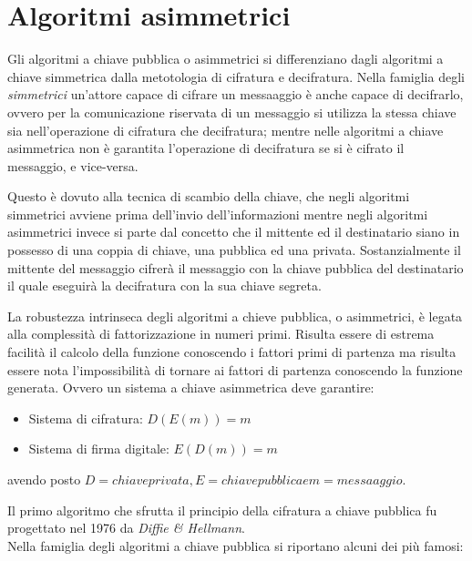 \documentclass[11pt, a4paper, oneside]{Thesis} %
\begin{document}
\section{Algoritmi asimmetrici}
Gli algoritmi a chiave pubblica o asimmetrici si differenziano dagli algoritmi a chiave simmetrica dalla metotologia di cifratura e decifratura.
Nella famiglia degli \textit{simmetrici} un'attore capace di cifrare un messaaggio è anche capace di decifrarlo, ovvero per la comunicazione riservata di un messaggio si utilizza la stessa chiave
sia nell'operazione di cifratura che decifratura; mentre nelle algoritmi a chiave asimmetrica non è garantita l'operazione di decifratura se si è cifrato il messaggio, e vice-versa.
\par Questo è dovuto alla tecnica di scambio della chiave, che negli algoritmi simmetrici avviene prima dell'invio dell'informazioni mentre negli algoritmi asimmetrici invece si parte dal concetto
che il mittente ed il destinatario siano in possesso di una coppia di chiave, una pubblica ed una privata. Sostanzialmente il mittente del messaggio cifrerà il messaggio con la chiave pubblica
del destinatario il quale eseguirà la decifratura con la sua chiave segreta.
\par La robustezza intrinseca degli algoritmi a chieve pubblica, o asimmetrici, è legata alla complessità di fattorizzazione in numeri primi. Risulta essere di estrema facilità il calcolo della funzione
conoscendo i fattori primi di partenza ma risulta essere nota l'impossibilità di tornare ai fattori di partenza conoscendo la funzione generata.
Ovvero un sistema a chiave asimmetrica deve garantire:
\begin{itemize}
 \item Sistema di cifratura: $D(E(m))=m$
 \item Sistema di firma digitale: $E(D(m))=m$
\end{itemize}
avendo posto  $D=chiave privata, E=chiave pubblica e m=messaaggio$.
\par Il primo algoritmo che sfrutta il principio della cifratura a chiave pubblica fu progettato nel 1976 da \emph{Diffie \& Hellmann}.
\\Nella famiglia degli algoritmi a chiave pubblica si riportano alcuni dei più famosi:
\end{document}

